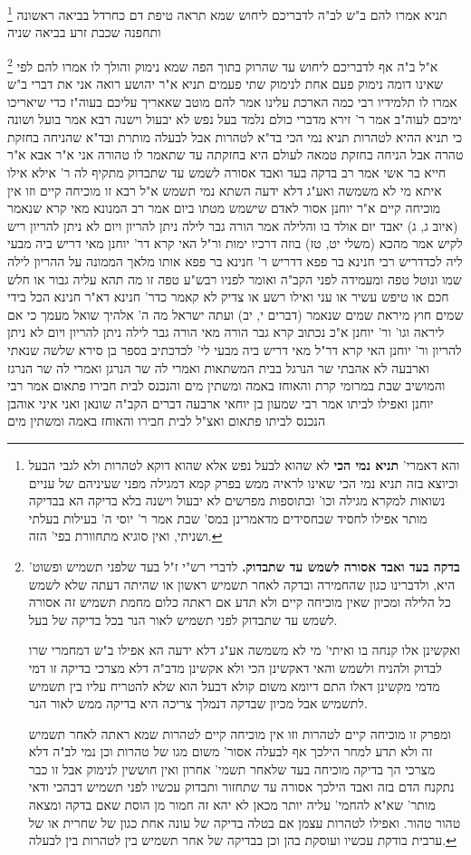 \documentclass[12pt, openany]{book}
\newcommand{\footnotecomment}[1]{
	\renewcommand\thefootnote{}
	\footnote{#1}}
\newcommand{\commenta}[1]{\footnotecomment{#1}}
\begin{document}
{\commenta{והא דאמרי' \textbf{תניא נמי הכי} לא שהוא לבעל נפש אלא שהוא דוקא לטהרות ולא לגבי הבעל וכיוצא בזה תניא נמי הכי שאינו לראיה ממש בפרק קמא דמגילה מפני שעיניהם של עניים נשואות למקרא מגילה וכו' ובתוספות מפרשים לא יבעול וישנה בלא בדיקה הא בבדיקה מותר אפילו לחסיד שבחסידים מדאמרינן במס' שבת אמר ר' יוסי ה' בעילות בעלתי ושניתי, ואין סוגיא מתחוורת בפי' הזה. }
תניא אמרו להם ב"ש לב"ה לדבריכם ליחוש שמא תראה טיפת דם כחרדל בביאה ראשונה ותחפנה שכבת זרע בביאה שניה 
\commenta{\textbf{בדקה בעד ואבד אסורה לשמש עד שתבדוק.} לדברי רש"י ז"ל בעד שלפני תשמיש ופשוט' היא, ולדברינו כגון שהחמירה ובדקה לאחר תשמיש ראשון או שהיתה דעתה שלא לשמש כל הלילה ומכיון שאין מוכיחה קיים ולא תדע אם ראתה כלום מחמת תשמיש זה אסורה לשמש עד שתבדוק לפני תשמיש לאור הנר בכל בדיקה של בעל.\par ואקשינן אלו קנחה בו ואיתי' מי לא משמשה אע"ג דלא ידעה הא אפילו ב"ש דמחמרי שרו לבדוק ולהניח ולשמש והאי דאקשינן הכי ולא אקשינן מדב"ה דלא מצרכי בדיקה זו דמי מדמי מקשינן דאלו התם דיומא משום קולא דבעל הוא שלא להטריח עליו בין תשמיש לתשמיש אבל מכיון שבדקה דנמלך צריכה היא בדיקה ממש לאור הנר.\par ומפרק זו מוכיחה קיים לטהרות וזו אין מוכיחה קיים לטהרות שמא ראתה לאחר תשמיש זה ולא תדע למחר הילכך אף לבעלה אסור' משום מגו של טהרות וכן נמי לב"ה דלא מצרכי הך בדיקה מוכיחה בעד שלאחר תשמי' אחרון ואין חוששין לנימוק אבל זו כבר נתקנח הדם בזה ואבד הילכך אסורה עד שתחזור ותבדוק עכשיו לפני תשמיש דבהכי ודאי מותר' שא"א להחמי' עליה יותר מכאן לא יהא זה חמור מן הוסת שאם בדקה ומצאה טהור טהור. ואפילו לטהרות עצמן אם בטלה בדיקה של עונה אחת כגון של שחרית או של ערבית בודקת עכשיו ועוסקת בהן וכן בבדיקה של אחר תשמיש בין לטהרות בין לבעלה. }
א"ל ב"ה אף לדבריכם ליחוש עד שהרוק בתוך הפה שמא נימוק והולך לו 
אמרו להם לפי שאינו דומה נימוק פעם אחת לנימוק שתי פעמים 
תניא א"ר יהושע רואה אני את דברי ב"ש אמרו לו תלמידיו רבי כמה הארכת עלינו אמר להם מוטב שאאריך עליכם בעוה"ז כדי שיאריכו ימיכם לעוה"ב 
אמר ר' זירא מדברי כולם נלמד בעל נפש לא יבעול וישנה 
רבא אמר בועל ושונה כי תניא ההיא לטהרות 
תניא נמי הכי בד"א לטהרות אבל לבעלה מותרת ובד"א שהניחה בחזקת טהרה אבל הניחה בחזקת טמאה לעולם היא בחזקתה עד שתאמר לו טהורה אני 
א"ר אבא א"ר חייא בר אשי אמר רב בדקה בעד ואבד אסורה לשמש עד שתבדוק מתקיף לה ר' אילא אילו איתא מי לא משמשה ואע"ג דלא ידעה השתא נמי תשמש 
א"ל רבא זו מוכיחה קיים וזו אין מוכיחה קיים
א"ר יוחנן  אסור לאדם שישמש מטתו ביום אמר רב המנונא מאי קרא שנאמר (איוב ג, ג) יאבד יום אולד בו והלילה אמר הורה גבר לילה ניתן להריון ויום לא ניתן להריון ריש לקיש אמר מהכא (משלי יט, טז) בוזה דרכיו ימות 
ור"ל האי קרא דר' יוחנן מאי דריש ביה מבעי ליה לכדדריש רבי חנינא בר פפא דדריש ר' חנינא בר פפא אותו מלאך הממונה על ההריון לילה שמו ונוטל טפה ומעמידה לפני הקב"ה ואומר לפניו רבש"ע טפה זו מה תהא עליה גבור או חלש חכם או טיפש עשיר או עני 
ואילו רשע או צדיק לא קאמר כדר' חנינא דא"ר חנינא הכל בידי שמים חוץ מיראת שמים שנאמר (דברים י, יב) ועתה ישראל מה ה' אלהיך שואל מעמך כי אם ליראה וגו' 
ור' יוחנן א"כ נכתוב קרא גבר הורה מאי הורה גבר לילה ניתן להריון ויום לא ניתן להריון 
ור' יוחנן האי קרא דר"ל מאי דריש ביה מבעי לי' לכדכתיב בספר בן סירא שלשה שנאתי וארבעה לא אהבתי שר הנרגל בבית המשתאות ואמרי לה שר הנרגן ואמרי לה שר הנרגז
והמושיב שבת במרומי קרת והאוחז באמה ומשתין מים והנכנס לבית חבירו פתאום אמר רבי יוחנן ואפילו לביתו 
אמר רבי שמעון בן יוחאי ארבעה דברים הקב"ה שונאן ואני איני אוהבן הנכנס לביתו פתאום ואצ"ל לבית חבירו והאוחז באמה ומשתין מים}
\end{document}
